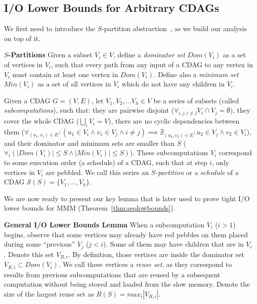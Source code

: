 \documentclass[sigplan,review,anonymous,10pt]{acmart}\settopmatter{printfolios=true,printccs=false,printacmref=false}
\newcommand{\macb}[1]{\textbf{\textsf{#1}}}
\begin{document}
\subsection{I/O Lower Bounds for Arbitrary CDAGs}
\label{sec:iolowerbounds}

We first need to introduce the $S$-partition abstraction~\cite{redblue}, as we 
build our analysis on top of it.

\macb{$S$-Partitions}
%
Given a subset $V_i \in V$, define a \emph{dominator set} $Dom(V_i)$ as a set 
of 
vertices in $V_i$, such that every path from any input of a 
CDAG to any vertex in $V_i$ must contain at least one vertex in $Dom(V_i)$. 
Define 
also a \emph{minimum set} $Min(V_i)$ as a set of all vertices in $V_i$ which do 
not 
have any children in $V_i$.

Given a CDAG $G = (V,E)$, let $V_1, V_2, \dots V_h \in V$ be a series of 
subsets (called \emph{subcomputations}), such that: they are 
pairwise disjoint ($\forall_{i,j, i \ne j}V_i \cap V_j = \emptyset )$, they 
cover the whole CDAG ($\bigcup_i V_i = V$),
there are no cyclic dependencies between them ($\forall_{(u_1,v_1) \in E}: (u_1 
\in V_i \land v_1 \in V_j  \land i \ne j) \implies \nexists_{(u_2,v_2) \in E}: 
u_2 \in V_j \land v_2 \in V_i$), and their dominator and minimum sets are 
smaller than $S$ ($\forall_i (|Dom(V_i)| \le S \land |Min(V_i)| \le S)$).
These subcomputations $V_i$ correspond to some execution order (a schedule) of 
a CDAG, such that at step $i$, only vertices in $V_i$ are pebbled. We call this 
series an \emph{$S$-partition} or a 
\emph{schedule} of a 
CDAG $\mathcal{S}(S) = \{V_1, \dots, V_h\}$.

We are now ready to present our key lemma that is later used to prove tight I/O 
lower 
bounds for 
MMM
(Theorem~\ref{thm:seqlowbounds}). 

\macb{General I/O Lower Bounds Lemma}
%
When a subcomputation $V_i$ ($i > 1$) begins, observe that some vertices may
already 
have red pebbles on them placed during some ``previous'' $V_j$ ($j < i$). 
Some 
of them may have children that are in $V_i$. Denote this set 
$V_{R,i}$. By 
definition, those vertices are inside the dominator set $V_{R,i} \subset 
Dom(V_i)$. We call 
these vertices a \emph{reuse set}, as they correspond to results from 
previous subcomputations that are reused by a subsequent computation without 
being stored and loaded from the slow memory. Denote the size of the largest 
reuse 
set as $R(S) = max_i|V_{R,i}|$. 
\end{document}
